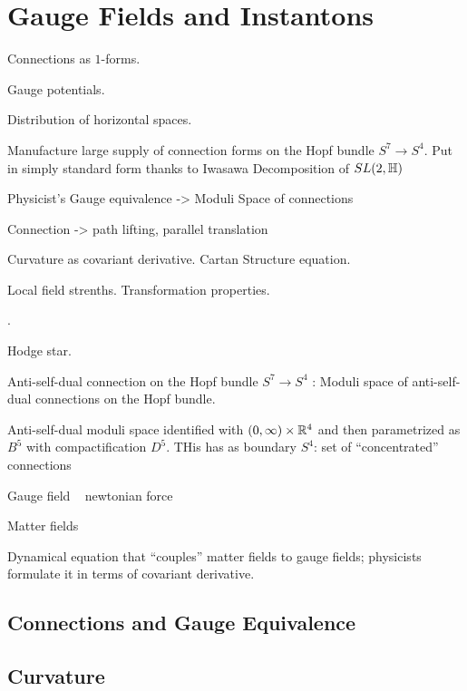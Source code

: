 \chapter{Gauge Fields and Instantons}

Connections as $1$-forms.

Gauge potentials.

Distribution of horizontal spaces.

Manufacture large supply of connection forms on the Hopf bundle $S^7\to S^4$. Put in simply standard form thanks to Iwasawa Decomposition of $SL(2, \mathbb{H})$

Physicist's Gauge equivalence -> Moduli Space of connections

Connection -> path lifting, parallel translation

Curvature as covariant derivative. Cartan Structure equation.

Local field strenths. Transformation properties.

.

Hodge star.

Anti-self-dual connection on the Hopf bundle $S^7 \to S^4$ : Moduli space of anti-self-dual connections on the Hopf bundle.

Anti-self-dual moduli space identified with $(0, \infty)\times \mathbb{R}^4$ and then parametrized as $B^5$ with compactification $D^5$. THis has as boundary $S^4$: set of ``concentrated'' connections

Gauge field ~ newtonian force

Matter fields

Dynamical equation that ``couples'' matter fields to gauge fields; physicists formulate it in terms of covariant derivative.



\section{Connections and Gauge Equivalence}

\section{Curvature}

